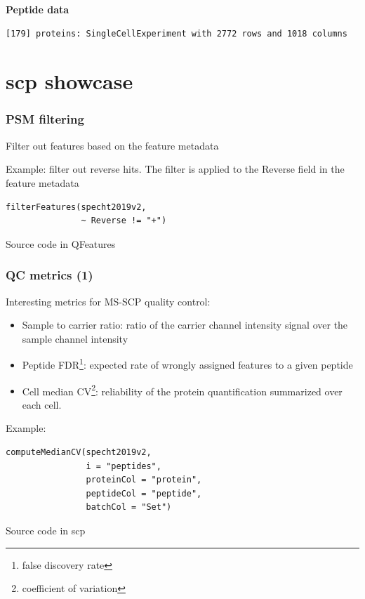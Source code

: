 \documentclass{beamer}
\newcommand{\hcode}[2][lgray]{{\ttfamily\color{vdgray}\colorbox{#1}{#2}}}
\newcommand{\frametitlesection}[1]{\frametitle{\centering #1 \footnotesize \hspace{0pt plus 1 filll} \insertsection}}
\begin{document}
\begin{frame}[fragile]
    \textbf{Peptide data}

    \begin{lstlisting}[language = TeX, numbers = none, basicstyle = \ttfamily\@setfontsize{\srcsize}{5pt}{5pt}\color{vdgray}]
 [179] proteins: SingleCellExperiment with 2772 rows and 1018 columns
    \end{lstlisting}


\end{frame}


\section{scp showcase}

\begin{frame}[fragile]
    \frametitlesection{PSM filtering}

    Filter out features based on the feature metadata

    \bigskip

    Example: filter out reverse hits. The filter is applied to the
    \hcode{Reverse} field in the feature metadata

    \begin{lstlisting}
filterFeatures(specht2019v2,
               ~ Reverse != "+")
    \end{lstlisting}

    Source code in \hcode{QFeatures}
\end{frame}

\begin{frame}[fragile]
    \frametitlesection{QC metrics (1)}
    \small
    Interesting metrics for MS-SCP quality control:

    \begin{itemize}
        \item{Sample to carrier ratio}: ratio of the carrier channel intensity
        signal over the sample channel intensity
        \item{Peptide FDR\footnote{false discovery rate}: expected rate of
        wrongly assigned features to a given peptide}
        \item{Cell median CV\footnote{coefficient of variation}: reliability of
        the protein quantification summarized over each cell.}
    \end{itemize}

    Example:

    \begin{lstlisting}
computeMedianCV(specht2019v2,
                i = "peptides",
                proteinCol = "protein",
                peptideCol = "peptide",
                batchCol = "Set")
    \end{lstlisting}

    Source code in \hcode{scp}

\end{frame}
\end{document}
